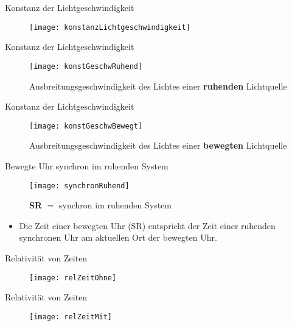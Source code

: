 \documentclass[]{beamer}%
\begin{document}
\begin{frame}{Konstanz der Lichtgeschwindigkeit}
    \begin{figure}[h]
            \centering
            \texttt{[image: konstanzLichtgeschwindigkeit]}
            \caption{\cite{Einstein1905}}
    \end{figure}
\end{frame}

\begin{frame}{Konstanz der Lichtgeschwindigkeit}
    \begin{figure}[h]
        \centering
        \texttt{[image: konstGeschwRuhend]}
        \caption{Ausbreitungsgeschwindigkeit des Lichtes einer \textbf{ruhenden} Lichtquelle}
    \end{figure}
\end{frame}

\begin{frame}{Konstanz der Lichtgeschwindigkeit}
    \begin{figure}[h]
        \centering
        \texttt{[image: konstGeschwBewegt]}
        \caption{Ausbreitungsgeschwindigkeit des Lichtes einer \textbf{bewegten} Lichtquelle}
    \end{figure}
\end{frame}

\begin{frame}{Bewegte Uhr synchron im ruhenden System}
    \begin{figure}[h]
        \centering
        \texttt{[image: synchronRuhend]}
        \caption{\textbf{SR} $=$ synchron im ruhenden System}
    \end{figure}
\begin{itemize}
    \item Die Zeit einer bewegten Uhr (SR)  entspricht der Zeit einer ruhenden synchronen Uhr am aktuellen Ort der bewegten Uhr.
\end{itemize}
\end{frame}

\begin{frame}{Relativität von Zeiten}
    \begin{figure}[h]
        \centering
        \texttt{[image: relZeitOhne]}
    \end{figure}
\end{frame}

\begin{frame}{Relativität von Zeiten}
    \begin{figure}[h]
        \centering
        \texttt{[image: relZeitMit]}
    \end{figure}
\end{frame}
\end{document}
